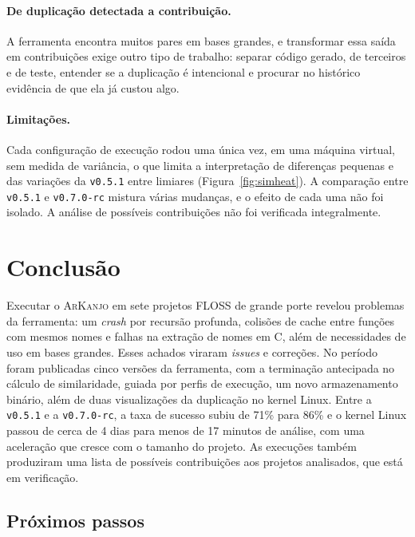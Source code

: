 \documentclass{article}
\newcommand{\cpp}{C\nolinebreak\hspace{-.05em}\raisebox{.4ex}{\relsize{-3}{\textbf{+}}}\nolinebreak\hspace{-.10em}\raisebox{.4ex}{\relsize{-3}{\textbf{+}}}}
\newcommand{\scene}[2]{\todo[size=\tiny,color=blue!10]{#1 (#2)}}
\newcommand{\ark}{\textsc{ArKanjo}}
\newcommand{\vnova}{\texttt{v0.7.0-rc}}
\begin{document}
\paragraph{De duplicação detectada a contribuição.}
A ferramenta encontra muitos pares em bases grandes, e transformar essa saída em contribuições exige outro tipo de trabalho: separar código gerado, de terceiros e de teste, entender se a duplicação é intencional e procurar no histórico evidência de que ela já custou algo.

\paragraph{Limitações.}
Cada configuração de execução rodou uma única vez, em uma máquina virtual, sem medida de variância, o que limita a interpretação de diferenças pequenas e das variações da \texttt{v0.5.1} entre limiares (Figura~\ref{fig:simheat}). A comparação entre \texttt{v0.5.1} e \vnova{} mistura várias mudanças, e o efeito de cada uma não foi isolado. A análise de possíveis contribuições não foi verificada integralmente.

\section{Conclusão}

\scene{Scene 6}{9:30--10:15}

Executar o \ark{} em sete projetos FLOSS de grande porte revelou problemas da ferramenta: um \emph{crash} por recursão profunda, colisões de cache entre funções com mesmos nomes e falhas na extração de nomes em \cpp, além de necessidades de uso em bases grandes. Esses achados viraram \textit{issues} e correções. No período foram publicadas cinco versões da ferramenta, com a terminação antecipada no cálculo de similaridade, guiada por perfis de execução, um novo armazenamento binário, além de duas visualizações da duplicação no kernel Linux. Entre a \texttt{v0.5.1} e a \vnova{}, a taxa de sucesso subiu de 71\% para 86\% e o kernel Linux passou de cerca de 4 dias para menos de 17 minutos de análise, com uma aceleração que cresce com o tamanho do projeto. As execuções também produziram uma lista de possíveis contribuições aos projetos analisados, que está em verificação.

\subsection{Próximos passos}
\end{document}
